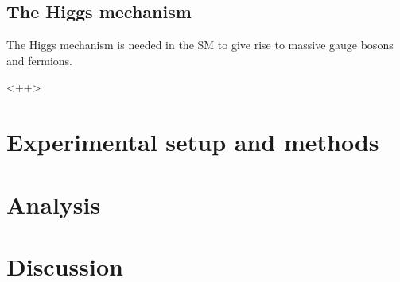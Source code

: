 \documentclass[twoside,        %
               BCOR12mm,       %
               ngerman,english, %
               fleqn,headsepline=false,footsepline=false
              ]{Vorlage/MFPREPORT}
\begin{document}
\subsection{The Higgs mechanism}

The Higgs mechanism is needed in the SM to give rise to massive gauge bosons
and fermions. 

<++>




\section{Experimental setup and methods}
\label{sec:setup}

\section{Analysis}
\label{sec:analysis}

\section{Discussion}
\label{sec:discussion}



\newpage

\begin{appendices}
\end{appendices}
\end{document}
